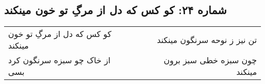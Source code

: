 \begin{center}
\section*{شماره ۲۴: کو کس که دل از مرگِ تو خون مینکند}
\label{sec:024}
\begin{longtable}{l p{0.5cm} r}
کو کس که دل از مرگِ تو خون مینکند
&&
تن نیز ز نوحه سرنگون مینکند
\\
از خاک چو سبزه سرنگون کرد بسی
&&
چون سبزه خطی سبز برون مینکند
\\
\end{longtable}
\end{center}
